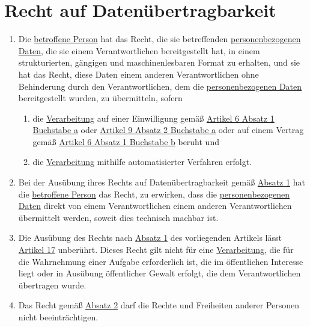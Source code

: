 \chapter{Recht auf Datenübertragbarkeit}
\label{ch:20}


\begin{enumerate}

  \item Die \hyperref[itm:04-1]{betroffene Person} hat das Recht, die sie betreffenden \hyperref[itm:04-1]{personenbezogenen Daten}, die sie einem
   Verantwortlichen bereitgestellt hat, in einem strukturierten, gängigen und maschinenlesbaren Format zu erhalten, und
   sie hat das Recht, diese Daten einem anderen Verantwortlichen ohne Behinderung durch den Verantwortlichen, dem die
   \hyperref[itm:04-1]{personenbezogenen Daten} bereitgestellt wurden, zu übermitteln, sofern
  \label{itm:20-1}

  \begin{enumerate}
  
    \item die \hyperref[itm:04-2]{Verarbeitung} auf einer Einwilligung gemäß \hyperref[itm:06-1a]{Artikel 6 Absatz 1 Buchstabe a} oder
    \hyperref[itm:09-2a]{Artikel 9 Absatz 2 Buchstabe a} oder auf einem Vertrag gemäß \hyperref[itm:06-1b]{Artikel 6
     Absatz 1 Buchstabe b} beruht und
  \label{itm:20-1a}

    \item die \hyperref[itm:04-2]{Verarbeitung} mithilfe automatisierter Verfahren erfolgt.
  \label{itm:20-1b}

  \end{enumerate}

  \item Bei der Ausübung ihres Rechts auf Datenübertragbarkeit gemäß \hyperref[itm:20-1]{Absatz 1} hat die \hyperref[itm:04-1]{betroffene
   Person} das Recht, zu erwirken, dass die \hyperref[itm:04-1]{personenbezogenen Daten} direkt von einem Verantwortlichen einem anderen
   Verantwortlichen übermittelt werden, soweit dies technisch machbar ist.
  \label{itm:20-2}

  \item Die Ausübung des Rechts nach \hyperref[itm:20-1]{Absatz 1} des vorliegenden Artikels lässt \hyperref[ch:17]
   {Artikel 17} unberührt. Dieses Recht gilt nicht für eine \hyperref[itm:04-2]{Verarbeitung}, die für die Wahrnehmung einer Aufgabe
   erforderlich ist, die im öffentlichen Interesse liegt oder in Ausübung öffentlicher Gewalt erfolgt, die dem
   Verantwortlichen übertragen wurde.
  \label{itm:20-3}

  \item Das Recht gemäß \hyperref[itm:20-2]{Absatz 2} darf die Rechte und Freiheiten anderer Personen nicht
   beeinträchtigen.
  \label{itm:20-4}

\end{enumerate}


